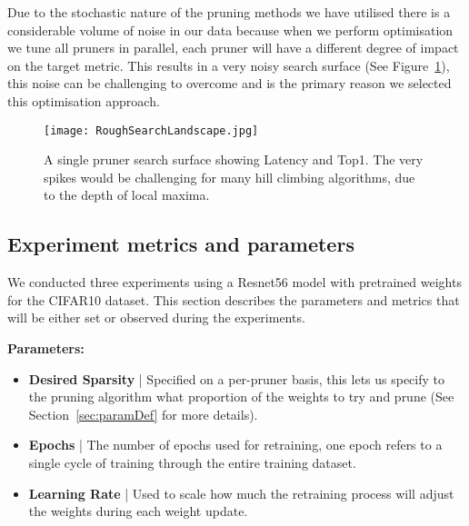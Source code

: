 \documentclass[../Dissertation.tex]{subfiles}
\begin{document}
Due to the stochastic nature of the pruning methods we have utilised there is a considerable volume of noise in our data because when we perform optimisation we tune all pruners in parallel, each pruner will have a different degree of impact on the target metric.
This results in a very noisy search surface (See Figure~\ref{fig:roughSurface}), this noise can be challenging to overcome and is the primary reason we selected this optimisation approach.
\begin{figure}[H]
    \centering
    \texttt{[image: RoughSearchLandscape.jpg]}
    \caption{A single pruner search surface showing Latency and Top1. The very spikes would be challenging for many hill climbing algorithms, due to the depth of local maxima.}
    \label{fig:roughSurface}
\end{figure}
\subsection{Experiment metrics and parameters}\label{sec:metricsandparams}


We conducted three experiments using a Resnet56 model with pretrained weights for the CIFAR10 dataset.
This section describes the parameters and metrics that will be either set or observed during the experiments.

\singlespacing
\noindent\textbf{Parameters:}
\begin{itemize}
    \item \textbf{Desired Sparsity} | Specified on a per-pruner basis, this lets us specify to the pruning algorithm what proportion of the weights to try and prune (See Section~\ref{sec:paramDef} for more details).
    \item \textbf{Epochs} | The number of epochs used for retraining, one epoch refers to a single cycle of training through the entire training dataset.
    \item \textbf{Learning Rate} | Used to scale how much the retraining process will adjust the weights during each weight update.
\end{itemize}
\doublespacing
\end{document}
